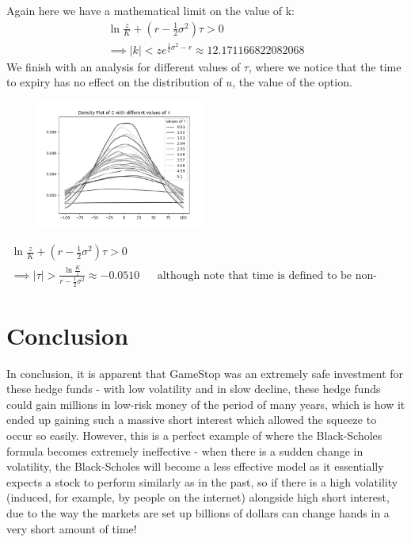 \documentclass[11pt]{article} %
\begin{document}
Again here we have a mathematical limit on the value of k:
\begin{align}
    \ln{\frac{z}{K}} + (r - \frac{1}{2} \sigma^2)\tau > 0 \\
    \implies |k| < ze^{\frac{1}{2}\sigma^2 - r} \approx 12.171166822082068
\end{align}
We finish with an analysis for different values of $\tau$, where we notice that 
the time to expiry has no effect on the distribution of $u$, the value of the 
option.
\begin{figure}[h] 
    \centering
    \includegraphics[width=0.5\textwidth]{tauvalue.png} 
    \caption[]{}\label{tauvalue}
\end{figure}
\begin{align}
    \ln{\frac{z}{K}} + (r - \frac{1}{2} \sigma^2)\tau > 0 \\
    \implies |\tau| > \frac{\ln{\frac{K}{z}}}{r - \frac{1}{2}\sigma^2} 
    \approx -0.0510&& \text{although note that time is 
    defined to be non-negative.}
\end{align}
\section{Conclusion}
In conclusion, it is apparent that GameStop was an extremely safe investment 
for these hedge funds - with low volatility and in slow decline, these hedge 
funds could gain millions in low-risk money of the period of many years, which 
is how it ended up gaining such a massive short interest which allowed the 
squeeze to occur so easily. However, this is a perfect example of where 
the Black-Scholes formula becomes extremely ineffective - when there is a 
sudden change in volatility, the Black-Scholes will become a less effective 
model as it essentially expects a stock to perform similarly as in the past, 
so if there is a high volatility (induced, for example, by people on the 
internet) alongside high short interest, due to the way the markets are 
set up billions of dollars can change hands in a very short amount of time!
\end{document}
